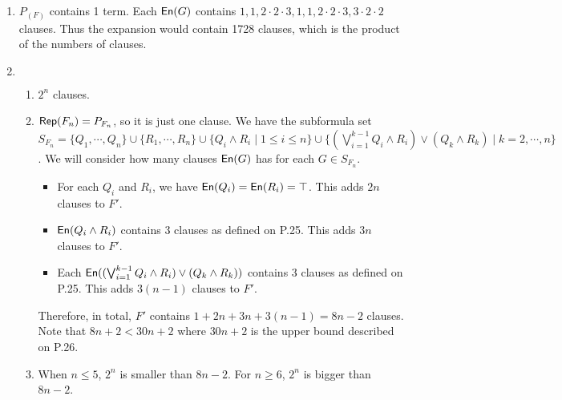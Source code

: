 \begin{exer}[1.7]
    $ $
    \begin{enumerate}[label=(\alph*)]
        \item
            $P_{(F)}$ contains 1 term.
            Each $\operatorname{\textsf{En}}(G)$ contains $1, 1, 2 \cdot 2 \cdot 3, 1, 1, 2 \cdot 2 \cdot 3, 3 \cdot 2 \cdot 2$ clauses.
            Thus the expansion would contain 1728 clauses, which is the product of the numbers of clauses.
        \item
            $ $
            \begin{enumerate}[label=(\roman*)]
                \item
                    $2^n$ clauses.
                \item
                    $\operatorname{\textsf{Rep}}(F_n) = P_{F_n}$, so it is just one clause.
                    We have the subformula set $S_{F_n} = \{ Q_1, \cdots, Q_n \} \cup \{ R_1, \cdots, R_n \} \cup \{ Q_i \land R_i \mid 1 \leq i \leq n \} \cup \{ (\bigvee_{i=1}^{k-1} Q_i \land R_i) \lor (Q_k \land R_k) \mid k = 2, \cdots, n \}$.
                    We will consider how many clauses $\operatorname{\textsf{En}}(G)$ has for each $G \in S_{F_n}$.
                    \begin{itemize}
                        \item
                            For each $Q_i$ and $R_i$, we have $\operatorname{\textsf{En}}(Q_i) = \operatorname{\textsf{En}}(R_i) = \top$.
                            This adds $2n$ clauses to $F'$.
                        \item
                            $\operatorname{\textsf{En}}(Q_i \land R_i)$ contains 3 clauses as defined on P.25.
                            This adds $3n$ clauses to $F'$.
                        \item
                            Each $\operatorname{\textsf{En}}((\bigvee_{i=1}^{k-1} Q_i \land R_i) \lor (Q_k \land R_k))$ contains 3 clauses as defined on P.25.
                            This adds $3(n - 1)$ clauses to $F'$.
                    \end{itemize}
                    Therefore, in total, $F'$ contains $1 + 2n + 3n + 3(n - 1) = 8n - 2$ clauses.
                    Note that $8n + 2 < 30n + 2$ where $30n + 2$ is the upper bound described on P.26.
                \item
                    When $n \leq 5$, $2^n$ is smaller than $8n - 2$.
                    For $n \geq 6$, $2^n$ is bigger than $8n - 2$.
            \end{enumerate}
    \end{enumerate}
\end{exer}

